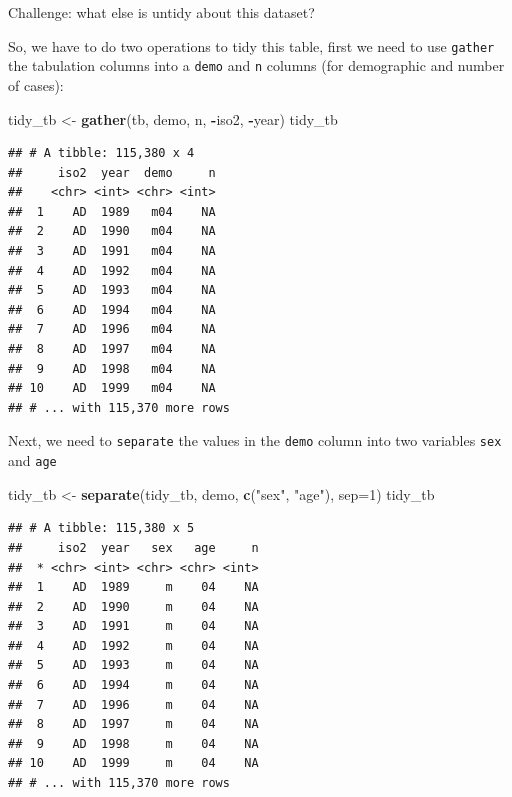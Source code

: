 \documentclass[12pt,]{book}
\newenvironment{Shaded}{\begin{snugshade}}{\end{snugshade}}
\newcommand{\KeywordTok}[1]{\textcolor[rgb]{0.13,0.29,0.53}{\textbf{#1}}}
\newcommand{\DataTypeTok}[1]{\textcolor[rgb]{0.13,0.29,0.53}{#1}}
\newcommand{\DecValTok}[1]{\textcolor[rgb]{0.00,0.00,0.81}{#1}}
\newcommand{\StringTok}[1]{\textcolor[rgb]{0.31,0.60,0.02}{#1}}
\newcommand{\OperatorTok}[1]{\textcolor[rgb]{0.81,0.36,0.00}{\textbf{#1}}}
\newcommand{\NormalTok}[1]{#1}
\theoremstyle{definition}
\theoremstyle{definition}
\theoremstyle{remark}
\begin{document}
Challenge: what else is untidy about this dataset?

So, we have to do two operations to tidy this table, first we need to
use \texttt{gather} the tabulation columns into a \texttt{demo} and
\texttt{n} columns (for demographic and number of cases):

\begin{Shaded}
\begin{Highlighting}[]
\NormalTok{tidy_tb <-}\StringTok{ }\KeywordTok{gather}\NormalTok{(tb, demo, n, }\OperatorTok{-}\NormalTok{iso2, }\OperatorTok{-}\NormalTok{year)}
\NormalTok{tidy_tb}
\end{Highlighting}
\end{Shaded}

\begin{verbatim}
## # A tibble: 115,380 x 4
##     iso2  year  demo     n
##    <chr> <int> <chr> <int>
##  1    AD  1989   m04    NA
##  2    AD  1990   m04    NA
##  3    AD  1991   m04    NA
##  4    AD  1992   m04    NA
##  5    AD  1993   m04    NA
##  6    AD  1994   m04    NA
##  7    AD  1996   m04    NA
##  8    AD  1997   m04    NA
##  9    AD  1998   m04    NA
## 10    AD  1999   m04    NA
## # ... with 115,370 more rows
\end{verbatim}

Next, we need to \texttt{separate} the values in the \texttt{demo}
column into two variables \texttt{sex} and \texttt{age}

\begin{Shaded}
\begin{Highlighting}[]
\NormalTok{tidy_tb <-}\StringTok{ }\KeywordTok{separate}\NormalTok{(tidy_tb, demo, }\KeywordTok{c}\NormalTok{(}\StringTok{"sex"}\NormalTok{, }\StringTok{"age"}\NormalTok{), }\DataTypeTok{sep=}\DecValTok{1}\NormalTok{)}
\NormalTok{tidy_tb}
\end{Highlighting}
\end{Shaded}

\begin{verbatim}
## # A tibble: 115,380 x 5
##     iso2  year   sex   age     n
##  * <chr> <int> <chr> <chr> <int>
##  1    AD  1989     m    04    NA
##  2    AD  1990     m    04    NA
##  3    AD  1991     m    04    NA
##  4    AD  1992     m    04    NA
##  5    AD  1993     m    04    NA
##  6    AD  1994     m    04    NA
##  7    AD  1996     m    04    NA
##  8    AD  1997     m    04    NA
##  9    AD  1998     m    04    NA
## 10    AD  1999     m    04    NA
## # ... with 115,370 more rows
\end{verbatim}
\end{document}
